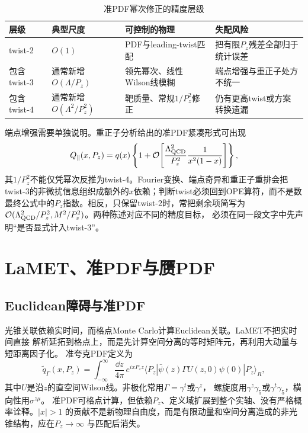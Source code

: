 \begin{table}[htbp]
  \centering
  \small
  \caption{准PDF幂次修正的精度层级}
  \label{tab:b04-power-hierarchy}
  \begin{tabularx}{\textwidth}{@{}lXXX@{}}
    \toprule
    层级 & 典型尺度 & 可控制的物理 & 失配风险 \\
    \midrule
    twist-2 & $O(1)$ & PDF与leading-twist匹配 & 把有限$P_z$残差全部归于统计误差 \\
    包含twist-3 & 通常新增$O(\Lambda/P_z)$ & 领先幂次、线性Wilson线模糊 & 端点增强与重正子处方不统一 \\
    包含twist-4 & 通常新增$O(\Lambda^2/P_z^2)$ & 靶质量、常规$1/P_z^2$修正 & 仍有更高twist或方案转换遗漏 \\
    \bottomrule
  \end{tabularx}
\end{table}

端点增强需要单独说明。重正子分析给出的准PDF紧凑形式可出现
\begin{equation}
  Q_\parallel(x,P_z)=q(x)\left\{
  1+\mathcal O\!\left[
  \frac{\Lambda_{\rm QCD}^2}{P_z^2}\frac{1}{x^2(1-x)}
  \right]\right\},
  \label{eq:b04-qpdf-power}
\end{equation}
其$1/P_z^2$不能仅凭幂次反推为twist-4。Fourier变换、端点奇异和重正子重排会把
twist-3的非微扰信息组织成额外的$x$依赖；判断twist必须回到OPE算符，而不是数
最终公式中的$P_z$指数。相反，只保留twist-2时，常把剩余项简写为
$\mathcal O(\Lambda_{\rm QCD}^2/P_z^2,M^2/P_z^2)$。两种陈述对应不同的精度目标，
必须在同一段文字中先声明“是否显式计入twist-3”。

\chapter{LaMET、准PDF与赝PDF}

\section{Euclidean障碍与准PDF}

光锥关联依赖实时间，而格点Monte Carlo计算Euclidean关联。LaMET不把实时间直接
解析延拓到格点上，而是先计算空间分离的等时矩阵元，再利用大动量与短距离因子化。
准夸克PDF定义为
\begin{equation}
  \tilde q_\Gamma(x,P_z)
  =\int_{-\infty}^{\infty}\frac{\dd z}{4\pi}\,
  e^{ixP_z z}
  \langle P_z|\bar\psi(z)\Gamma U(z,0)\psi(0)|P_z\rangle_R,
  \label{eq:b04-quasi}
\end{equation}
其中$U$是沿$z$的直空间Wilson线。非极化常用$\Gamma=\gamma^t$或$\gamma^z$，
螺旋度用$\gamma^z\gamma_5$或$\gamma^t\gamma_5$，横向性用$\sigma^{z\mu}$。
准PDF可格点计算，但依赖$P_z$、定义域扩展到整个实轴、没有严格概率诠释。$|x|>1$
的贡献不是新物理自由度，而是有限动量和空间分离造成的非光锥结构，应在$P_z\to\infty$
与匹配后消失。

